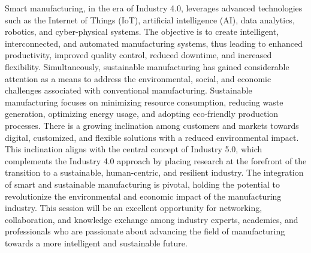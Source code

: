 Smart manufacturing, in the era of Industry 4.0, leverages advanced technologies such as the Internet of Things (IoT), artificial intelligence (AI), data analytics, robotics, and cyber-physical systems. The objective is to create intelligent, interconnected, and automated manufacturing systems, thus leading to enhanced productivity, improved quality control, reduced downtime, and increased flexibility. Simultaneously, sustainable manufacturing has gained considerable attention as a means to address the environmental, social, and economic challenges associated with conventional manufacturing. Sustainable manufacturing focuses on minimizing resource consumption, reducing waste generation, optimizing energy usage, and adopting eco-friendly production processes. There is a growing inclination among customers and markets towards digital, customized, and flexible solutions with a reduced environmental impact. This inclination aligns with the central concept of Industry 5.0, which complements the Industry 4.0 approach by placing research at the forefront of the transition to a sustainable, human-centric, and resilient industry. The integration of smart and sustainable manufacturing is pivotal, holding the potential to revolutionize the environmental and economic impact of the manufacturing industry.  This session will be an excellent opportunity for networking, collaboration, and knowledge exchange among industry experts, academics, and professionals who are passionate about advancing the field of manufacturing towards a more intelligent and sustainable future. 

\vfill\null